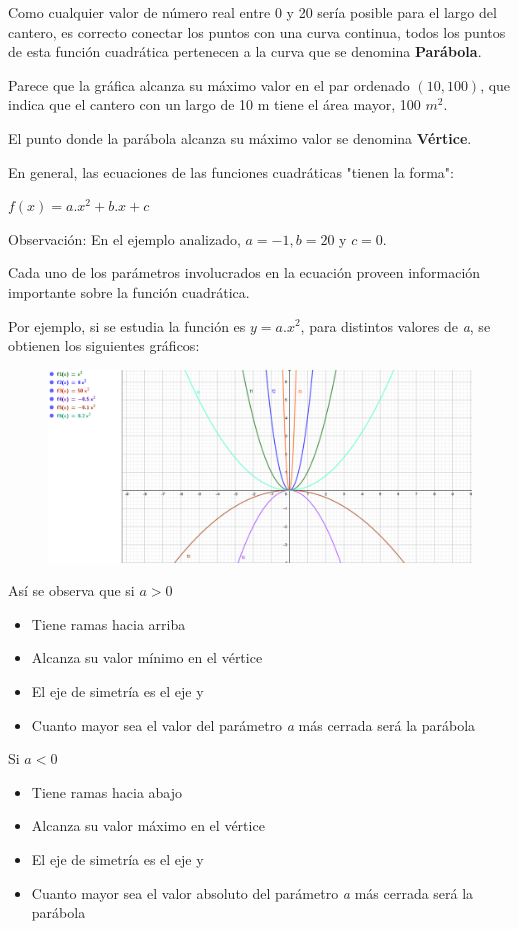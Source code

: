 \documentclass[a4paper,10pt,BCOR10mm,oneside,headsepline]{scrbook}
\begin{document}
Como cualquier valor de número real entre 0 y 20 sería posible para el largo del cantero, es correcto conectar los puntos con una curva continua, todos los puntos de esta función cuadrática pertenecen a la curva que se denomina \textbf{Parábola}.

Parece que la gráfica alcanza su máximo valor en el par ordenado $(10,100)$, que indica que el cantero con un largo de 10 m tiene el área mayor, 100 $m^2$.

El punto donde la parábola alcanza su máximo valor se denomina \textbf{Vértice}.

En general, las ecuaciones de las funciones cuadráticas "tienen la forma":
\begin{center}
	\textbf{$f(x)=a.x^{2}+b.x+c$}
\end{center}

Observación: En el ejemplo analizado, $a=-1, b=20$ y $c=0$.

Cada uno de los parámetros involucrados en la ecuación proveen información importante sobre la función cuadrática.

Por ejemplo, si se estudia la función es $y = a.x^{2}$, para distintos valores de \textit{a}, se obtienen los siguientes gráficos:

\begin{figure}[h!]
	\includegraphics[width=0.9\linewidth]{cuadratica3.png}
\end{figure}

Así se observa que si $\textit{a} > 0$
\begin{itemize}
	\item Tiene ramas hacia arriba
	\item Alcanza su valor mínimo en el vértice
	\item El eje de simetría es el eje y
	\item Cuanto mayor sea el valor del parámetro \textit{a} más cerrada será la parábola
\end{itemize} 
Si  $\textit{a} < 0$
\begin{itemize}
	\item Tiene ramas hacia abajo
	\item Alcanza su valor máximo en el vértice
	\item El eje de simetría es el eje y
	\item  Cuanto mayor sea el valor absoluto del parámetro \textit{a} más cerrada será la parábola
\end{itemize} 
\end{document}
